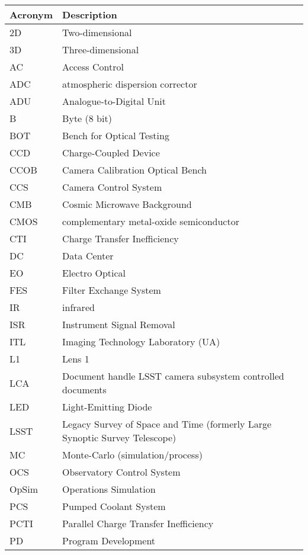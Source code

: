 \addtocounter{table}{-1}
\begin{longtable}{p{}p{}}\hline
\textbf{Acronym} & \textbf{Description}  \\\hline

2D & Two-dimensional \\\hline
3D & Three-dimensional \\\hline
AC & Access Control \\\hline
ADC & atmospheric dispersion corrector \\\hline
ADU & Analogue-to-Digital Unit \\\hline
B & Byte (8 bit) \\\hline
BOT & Bench for Optical Testing \\\hline
CCD & Charge-Coupled Device \\\hline
CCOB & Camera Calibration Optical Bench \\\hline
CCS & Camera Control System \\\hline
CMB & Cosmic Microwave Background \\\hline
CMOS & complementary metal-oxide semiconductor \\\hline
CTI & Charge Transfer Inefficiency \\\hline
DC & Data Center \\\hline
EO & Electro Optical \\\hline
FES & Filter Exchange System \\\hline
IR & infrared \\\hline
ISR & Instrument Signal Removal \\\hline
ITL & Imaging Technology Laboratory (UA) \\\hline
L1 & Lens 1 \\\hline
LCA & Document handle LSST camera subsystem controlled documents \\\hline
LED & Light-Emitting Diode \\\hline
LSST & Legacy Survey of Space and Time (formerly Large Synoptic Survey Telescope) \\\hline
MC & Monte-Carlo (simulation/process) \\\hline
OCS & Observatory Control System \\\hline
OpSim & Operations Simulation \\\hline
PCS & Pumped Coolant System \\\hline
PCTI & Parallel Charge Transfer Inefficiency \\\hline
PD & Program Development \\\hline

\end{longtable}
